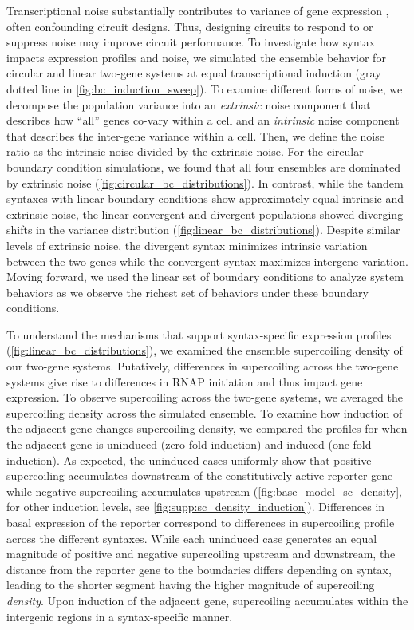 \documentclass[11pt]{article} %
\begin{document}
Transcriptional noise substantially contributes to variance of gene expression \parencite{quartonUncouplingGeneExpression2020}, often confounding circuit designs. Thus, designing circuits to respond to or suppress noise may improve circuit performance. To investigate how syntax impacts expression profiles and noise, we simulated the ensemble behavior for circular and linear two-gene systems at equal transcriptional induction (gray dotted line in \cref{fig:bc_induction_sweep}). To examine different forms of noise, we decompose the population variance into an \emph{extrinsic} noise component that describes how ``all'' genes co-vary within a cell and an \emph{intrinsic} noise component that describes the inter-gene variance within a cell. Then, we define the noise ratio as the intrinsic noise divided by the extrinsic noise. For the circular boundary condition simulations, we found that all four ensembles are dominated by extrinsic noise (\cref{fig:circular_bc_distributions}). In contrast, while the tandem syntaxes with linear boundary conditions show approximately equal intrinsic and extrinsic noise, the linear convergent and divergent populations showed diverging shifts in the variance distribution (\cref{fig:linear_bc_distributions}). Despite similar levels of extrinsic noise, the divergent syntax minimizes intrinsic variation between the two genes while the convergent syntax maximizes intergene variation. 
Moving forward, we used the linear set of boundary conditions to analyze system behaviors as we observe the richest set of behaviors under these boundary conditions.

To understand the mechanisms that support syntax-specific expression profiles (\cref{fig:linear_bc_distributions}), we examined the ensemble supercoiling density of our two-gene systems. Putatively, differences in supercoiling across the two-gene systems give rise to differences in RNAP initiation and thus impact gene expression. To observe supercoiling across the two-gene systems, we averaged the supercoiling density across the simulated ensemble. To examine how induction of the adjacent gene changes supercoiling density, we compared the profiles for when the adjacent gene is uninduced (zero-fold induction) and induced (one-fold induction). As expected, the uninduced cases uniformly show that positive supercoiling accumulates downstream of the constitutively-active reporter gene while negative supercoiling accumulates upstream (\cref{fig:base_model_sc_density}, for other induction levels, see \cref{fig:supp:sc_density_induction}). Differences in basal expression of the reporter correspond to differences in supercoiling profile across the different syntaxes. While each uninduced case generates an equal magnitude of positive and negative supercoiling upstream and downstream, the distance from the reporter gene to the boundaries differs depending on syntax, leading to the shorter segment having the higher magnitude of supercoiling \emph{density}. Upon induction of the adjacent gene, supercoiling accumulates within the intergenic regions in a syntax-specific manner.
\end{document}
